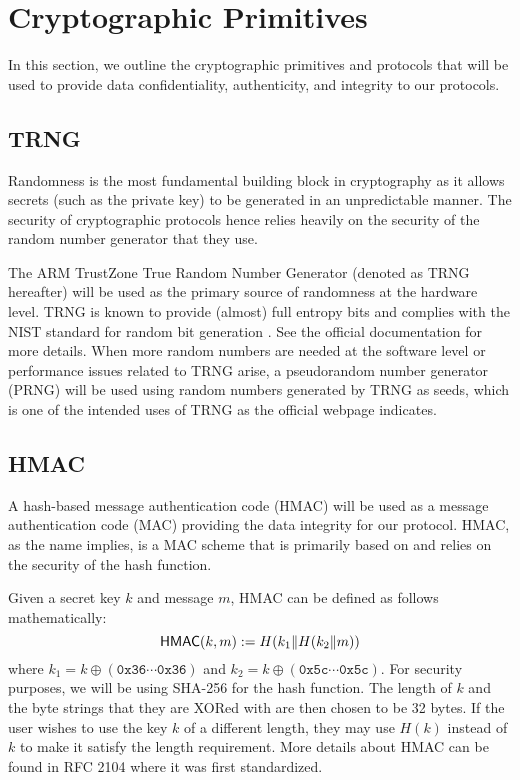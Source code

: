 \section{Cryptographic Primitives}
\label{sec:crypto-primitives}

In this section, we outline the cryptographic primitives and protocols that will be used to provide data confidentiality, authenticity, and integrity to our protocols. 

\subsection{TRNG}

Randomness is the most fundamental building block in cryptography as it allows secrets (such as the private key) to be generated in an unpredictable manner. The security of cryptographic protocols hence relies heavily on the security of the random number generator that they use.

The ARM TrustZone True Random Number Generator (denoted as TRNG hereafter) \cite{TRNG} will be used as the primary source of randomness at the hardware level. TRNG is known to provide (almost) full entropy bits and complies with the NIST standard for random bit generation \cite{NIST-TRNG}. See the official documentation \cite{TRNG} for more details. When more random numbers are needed at the software level or performance issues related to TRNG arise, a pseudorandom number generator (PRNG) will be used using random numbers generated by TRNG as seeds, which is one of the intended uses of TRNG as the official webpage \cite{TRNG} indicates.   

\subsection{HMAC}

A hash-based message authentication code (HMAC) will be used as a message authentication code (MAC) providing the data integrity for our protocol. HMAC, as the name implies, is a MAC scheme that is primarily based on and relies on the security of the hash function. 

Given a secret key $k$ and message $m$, HMAC can be defined as follows mathematically:
$$
\mathsf{HMAC}(k, m) := H(k_1 \| H(k_2 \| m))
$$
where $k_1 = k \oplus (\texttt{0x36} \cdots \texttt{0x36})$ and $k_2 = k \oplus (\texttt{0x5c}\cdots \texttt{0x5c})$. For security purposes, we will be using SHA-256 for the hash function. The length of $k$ and the byte strings that they are XORed with are then chosen to be 32 bytes. If the user wishes to use the key $k$ of a different length, they may use $H(k)$ instead of $k$ to make it satisfy the length requirement. More details about HMAC can be found in RFC 2104 \cite{rfc2104} where it was first standardized. 

